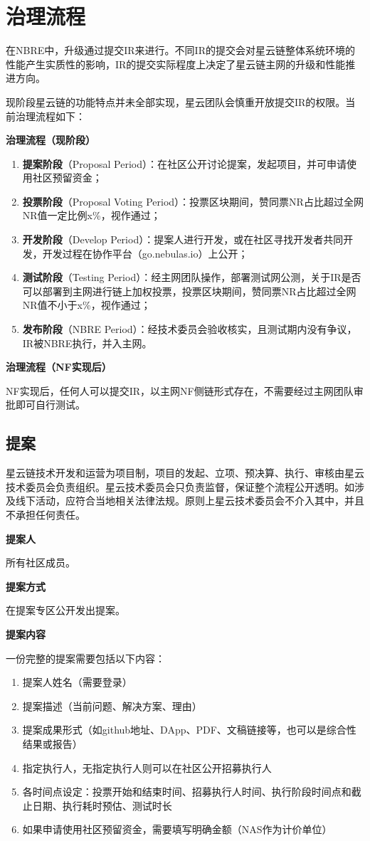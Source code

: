 \section{治理流程}
在NBRE中，升级通过提交IR来进行。不同IR的提交会对星云链整体系统环境的性能产生实质性的影响，IR的提交实际程度上决定了星云链主网的升级和性能推进方向。

现阶段星云链的功能特点并未全部实现，星云团队会慎重开放提交IR的权限。当前治理流程如下：

\textbf{治理流程（现阶段）}	
\begin{enumerate}
\item \textbf{提案阶段}（Proposal Period）：在社区公开讨论提案，发起项目，并可申请使用社区预留资金；
\item \textbf{投票阶段}（Proposal Voting Period）：投票区块期间，赞同票NR占比超过全网NR值一定比例x\%，视作通过；
\item \textbf{开发阶段}（Develop Period）：提案人进行开发，或在社区寻找开发者共同开发，开发过程在协作平台（go.nebulas.io）上公开；
\item \textbf{测试阶段}（Testing Period）：经主网团队操作，部署测试网公测，关于IR是否可以部署到主网进行链上加权投票，投票区块期间，赞同票NR占比超过全网NR值不小于x\%，视作通过；
\item \textbf{发布阶段}（NBRE Period）：经技术委员会验收核实，且测试期内没有争议，IR被NBRE执行，并入主网。
\end{enumerate}

\textbf{治理流程（NF实现后）}

NF实现后，任何人可以提交IR，以主网NF侧链形式存在，不需要经过主网团队审批即可自行测试。

\subsection{提案}
星云链技术开发和运营为项目制，项目的发起、立项、预决算、执行、审核由星云技术委员会负责组织。星云技术委员会只负责监督，保证整个流程公开透明。如涉及线下活动，应符合当地相关法律法规。原则上星云技术委员会不介入其中，并且不承担任何责任。

\textbf{提案人}

所有社区成员。

\textbf{提案方式}

在提案专区公开发出提案。

\textbf{提案内容}

一份完整的提案需要包括以下内容：
\begin{enumerate}
\item 提案人姓名（需要登录）
\item 提案描述（当前问题、解决方案、理由）
\item 提案成果形式（如github地址、DApp、PDF、文稿链接等，也可以是综合性结果或报告）
\item 指定执行人，无指定执行人则可以在社区公开招募执行人
\item 各时间点设定：投票开始和结束时间、招募执行人时间、执行阶段时间点和截止日期、执行耗时预估、测试时长
\item 如果申请使用社区预留资金，需要填写明确金额（NAS作为计价单位）
\end{enumerate}

